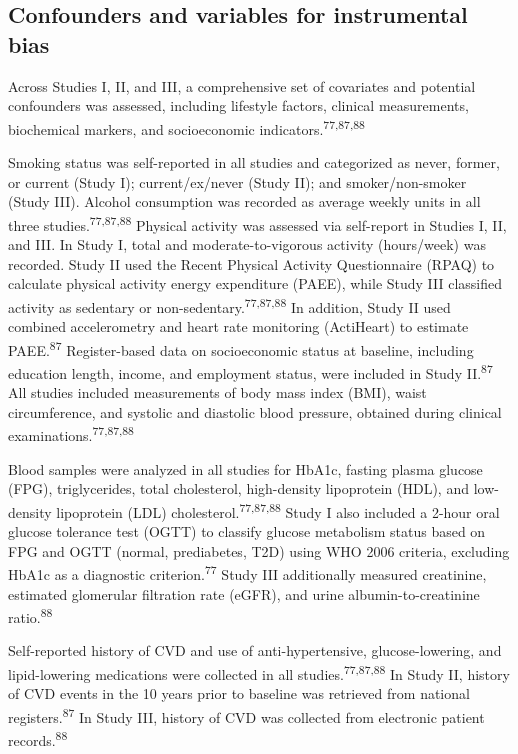 \documentclass[
  a4paper,
  headsepline=true,
  open=left]{scrbook}
\begin{document}
\hypertarget{confounders-and-variables-for-instrumental-bias}{%
\subsection{Confounders and variables for instrumental
bias}\label{confounders-and-variables-for-instrumental-bias}}

Across Studies I, II, and III, a comprehensive set of covariates and
potential confounders was assessed, including lifestyle factors,
clinical measurements, biochemical markers, and socioeconomic
indicators.\textsuperscript{77,87,88}

Smoking status was self-reported in all studies and categorized as
never, former, or current (Study I); current/ex/never (Study II); and
smoker/non-smoker (Study III). Alcohol consumption was recorded as
average weekly units in all three studies.\textsuperscript{77,87,88}
Physical activity was assessed via self-report in Studies I, II, and
III. In Study I, total and moderate-to-vigorous activity (hours/week)
was recorded. Study II used the Recent Physical Activity Questionnaire
(RPAQ) to calculate physical activity energy expenditure (PAEE), while
Study III classified activity as sedentary or
non-sedentary.\textsuperscript{77,87,88} In addition, Study II used
combined accelerometry and heart rate monitoring (ActiHeart) to estimate
PAEE.\textsuperscript{87} Register-based data on socioeconomic status at
baseline, including education length, income, and employment status,
were included in Study II.\textsuperscript{87} All studies included
measurements of body mass index (BMI), waist circumference, and systolic
and diastolic blood pressure, obtained during clinical
examinations.\textsuperscript{77,87,88}

Blood samples were analyzed in all studies for HbA1c, fasting plasma
glucose (FPG), triglycerides, total cholesterol, high-density
lipoprotein (HDL), and low-density lipoprotein (LDL)
cholesterol.\textsuperscript{77,87,88} Study I also included a 2-hour
oral glucose tolerance test (OGTT) to classify glucose metabolism status
based on FPG and OGTT (normal, prediabetes, T2D) using WHO 2006
criteria, excluding HbA1c as a diagnostic criterion.\textsuperscript{77}
Study III additionally measured creatinine, estimated glomerular
filtration rate (eGFR), and urine albumin-to-creatinine
ratio.\textsuperscript{88}

Self-reported history of CVD and use of anti-hypertensive,
glucose-lowering, and lipid-lowering medications were collected in all
studies.\textsuperscript{77,87,88} In Study II, history of CVD events in
the 10 years prior to baseline was retrieved from national
registers.\textsuperscript{87} In Study III, history of CVD was
collected from electronic patient records.\textsuperscript{88}
\end{document}
